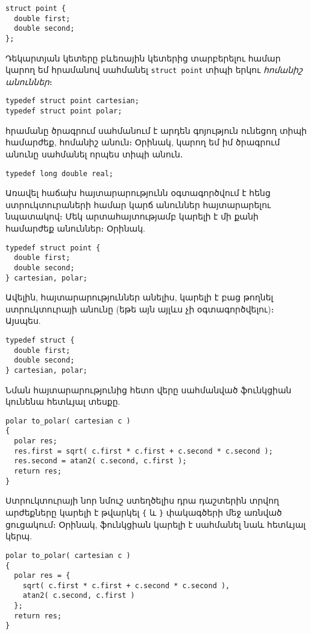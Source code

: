\begin{Verbatim}
struct point {
  double first;
  double second;
};
\end{Verbatim}

Դեկարտյան կետերը բևեռային կետերից տարբերելու համար կարող եմ 
հրամանով սահմանել \texttt{struct point} տիպի երկու \emph{հոմանիշ անուններ}։

\begin{Verbatim}
typedef struct point cartesian;
typedef struct point polar;
\end{Verbatim}

 հրամանը ծրագրում սահմանում է արդեն գոյություն ունեցող տիպի
համարժեք, հոմանիշ անուն։ Օրինակ, կարող եմ իմ ծրագրում  անունը
սահմանել որպես   տիպի անուն․

\begin{Verbatim}
typedef long double real;
\end{Verbatim}

Առավել հաճախ  հայտարարությունն օգտագործվում է հենց ստրուկտուրաների
համար կարճ անուններ հայտարարելու նպատակով։ Մեկ  արտահայտությամբ
կարելի է մի քանի համարժեք անուններ։ Օրինակ.

\begin{Verbatim}
typedef struct point {
  double first;
  double second;
} cartesian, polar;
\end{Verbatim}

Ավելին,  հայտարարություններ անելիս, կարելի է բաց թողնել
ստրուկտուրայի անունը (եթե այն այլևս չի օգտագործվելու)։ Այսպես.

\begin{Verbatim}
typedef struct {
  double first;
  double second;
} cartesian, polar;
\end{Verbatim}

Նման հայտարարությունից հետո վերը սահմանված  ֆունկցիան
կունենա հետևյալ տեսքը.

\begin{Verbatim}
polar to_polar( cartesian c )
{
  polar res;
  res.first = sqrt( c.first * c.first + c.second * c.second );
  res.second = atan2( c.second, c.first );
  return res;
}
\end{Verbatim}

Ստրուկտուրայի նոր նմուշ ստեղծելիս դրա դաշտերին տրվող արժեքները կարելի
է թվարկել \Verb|{| և \Verb|}| փակագծերի մեջ առնված ցուցակում։ Օրինակ,
 ֆունկցիան կարելի է սահմանել նաև հետևյալ կերպ.

\begin{Verbatim}
polar to_polar( cartesian c )
{
  polar res = {
    sqrt( c.first * c.first + c.second * c.second ),
    atan2( c.second, c.first )
  };
  return res;
}
\end{Verbatim}

